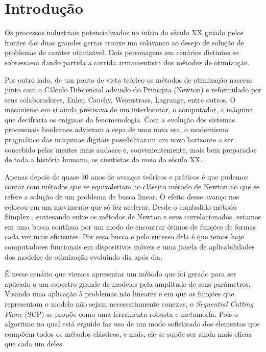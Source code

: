 
\chapter{Introdução}
\label{chap:introducao}

\noindent
Os processos industriais potencializados no início do século XX guiado pelos frontes das duas grandes gerras trouxe um solavanco ao desejo de solução de problemas de caráter otimizável. Dois personagens em cenários distintos se sobressaem dando partida a corrida armamentista dos métodos de otimização.

Por outro lado, de um ponto de vista teórico os métodos de otimização nascem junto com o Cálculo Diferencial advindo do Principia (Newton) e reformulado por seus colaboradores, Euler, Cauchy, Weierstrass, Lagrange, entre outros. O mecanismo em si ainda precisava de um interlocutor, o computador, a máquina que decifraria os enigmas da fenomenologia. Com a evolução dos sistemas processuais booleanos advieram a cepa de uma nova era, o modernismo pragmático das máquinas digitais possibilitaram um novo horizonte a ser concebido pelas mentes mais audazes e, convenientemente, mais bem preparadas de toda a história humana, os cientistas do meio do século XX. 

Apenas depois de quase 30 anos de avanços teóricos e práticos é que pudemos contar com métodos que se equivaleriam ao clássico método de Newton no que se refere a solução de um problema de busca linear. O efeito desse avanço nos colocou em um movimento que só fez acelerar. Desde o combalido método Simplex \cite{Dantzig_1963}, enviesando entre os métodos de Newton e seus correlacionados, estamos em uma busca contínua por um modo de encontrar ótimos de funções de formas cada vez mais eficientes. Por essa busca e pelo sucesso dela é que temos hoje computadores funcionais em dispositivos móveis e uma janela de aplicabilidades dos modelos de otimização evoluindo dia após dia. 

É nesse cenário que viemos apresentar um método que foi gerado para ser aplicado a um espectro grande de modelos pela amplitude de seus parâmetros. Visando uma aplicação à problemas não lineares e em que as funções que representam o modelo não sejam necessariamente conexas, o \textit{Sequential Cutting Plane} (SCP) se propõe como uma ferramenta robusta e metamorfa. Pois o algoritmo no qual está erguido faz uso de um modo sofisticado dos elementos que compõem todos os métodos clássicos, e mais, ele se supõe ser ainda mais eficaz que cada um deles.

